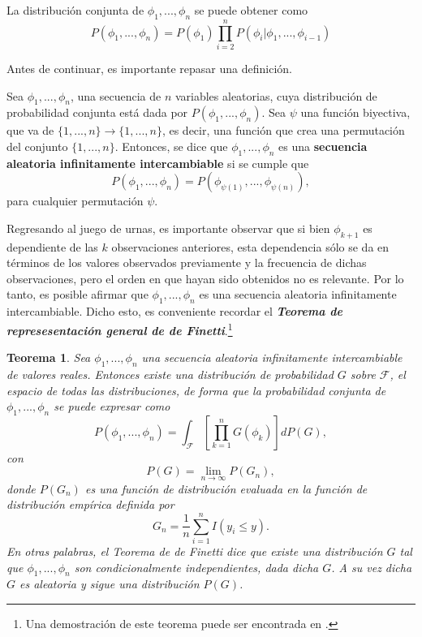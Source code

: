 La distribuci\'on conjunta de $\phi_1,...,\phi_n$ se puede obtener como
\begin{equation*}
    P(\phi_1,...,\phi_n) = 
    P(\phi_1)
    \prod_{i=2}^n
    P(\phi_i|\phi_1,...,\phi_{i-1})
\end{equation*}

Antes de continuar, es importante repasar una definici\'on. 

\begin{defin}
    Sea $\phi_1,...,\phi_n$, una secuencia de $n$ variables aleatorias, cuya distribuci\'on de probabilidad conjunta est\'a dada por $P(\phi_1,...,\phi_n)$. Sea $\psi$ una funci\'on biyectiva, que va de $\{1,...,n\} \rightarrow \{1,...,n\}$, es decir, una funci\'on que crea una permutaci\'on del conjunto $\{1,...,n\}$.  
    Entonces, se dice que $\phi_1,...,\phi_n$ es una \textbf{secuencia aleatoria infinitamente intercambiable} si se cumple que 
    \begin{equation*}
        P(\phi_1,...,\phi_n) = P(\phi_{\psi(1)},...,\phi_{\psi(n)}),
    \end{equation*}
    para cualquier permutaci\'on $\psi$.
\end{defin}

Regresando al juego de urnas, es importante observar que si bien $\phi_{k+1}$ es dependiente de las $k$ observaciones anteriores, esta dependencia s\'olo se da en t\'erminos de los valores observados previamente y la frecuencia de dichas observaciones, pero el orden en que hayan sido obtenidos no es relevante. Por lo tanto, es posible afirmar que $\phi_1,...,\phi_n$ es una secuencia aleatoria infinitamente intercambiable. Dicho esto, es conveniente recordar el \textbf{\textit{Teorema de represesentaci\'on general de de Finetti}}.\footnote{Una demostraci\'on de este teorema puede ser encontrada en \cite{Schervish_TheoryStats}.}

\newtheorem{theorem}{Teorema}

\begin{theorem}
    Sea $\phi_1, ...,\phi_n$ una secuencia aleatoria infinitamente intercambiable de valores reales. Entonces existe una distribuci\'on de probabilidad $G$ sobre $\mathcal{F}$, el espacio de todas las distribuciones, de forma que la probabilidad conjunta de $\phi_1, ...,\phi_n$ se puede expresar como
    \begin{equation*}
        P(\phi_1, ...,\phi_n) =
        \int_{\mathcal{F}}\left[\prod_{k=1}^n G(\phi_k)\right]dP(G),
    \end{equation*}
    con
    \begin{equation*}
        P(G) = \lim_{n \to \infty} P(G_n),
    \end{equation*}
    donde $P(G_n)$ es una funci\'on de distribuci\'on evaluada en la funci\'on de distribuci\'on emp\'irica definida por
    \begin{equation*}
        G_n = \frac{1}{n} \sum_{i=1}^n I(y_i \leq y).
    \end{equation*}
    En otras palabras, el Teorema de de Finetti dice que existe una distribuci\'on $G$ tal que $\phi_1, ...,\phi_n$ son condicionalmente independientes, dada dicha $G$. A su vez dicha $G$ es aleatoria y sigue una distribuci\'on $P(G)$.
\end{theorem}

